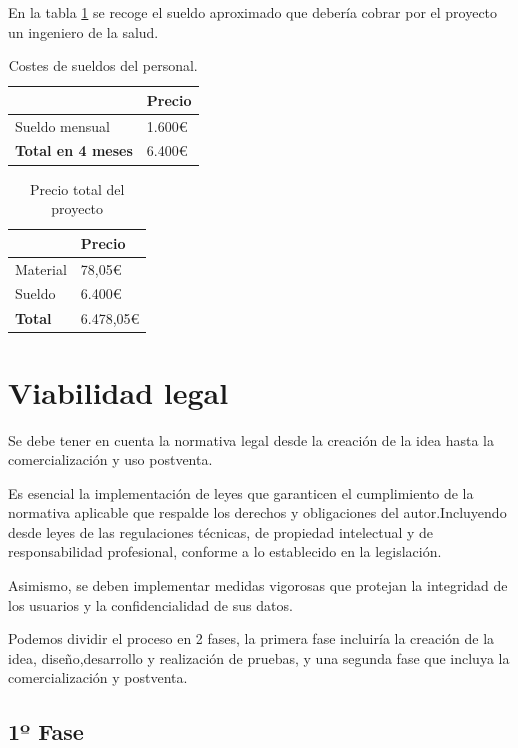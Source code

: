 En la tabla \ref{tab:costes_personal} se recoge el sueldo aproximado que debería cobrar por el proyecto un ingeniero de la salud.

\begin{table}[h]
\centering
\begin{tabular}{|l|l|}
\hline
\rowcolor[HTML]{BFBFBF} 
\textbf{} & \textbf{Precio} \\ \hline
Sueldo mensual & 1.600€ \\ \hline
\textbf{Total en 4 meses }& 6.400€ \\ \hline
\end{tabular}
\caption{Costes de sueldos del personal.}
\label{tab:costes_personal}
\end{table}

\begin{table}[h]
\centering
\begin{tabular}{|l|l|}
\hline
\rowcolor[HTML]{BFBFBF} 
\textbf{} & \textbf{Precio} \\ \hline
Material & 78,05€ \\ \hline
Sueldo  &  6.400€ \\ \hline
\textbf{Total }& 6.478,05€ \\ \hline
\end{tabular}
\caption{Precio total del proyecto}
\label{tab:Costes Totales}
\end{table}

\section{Viabilidad legal}
Se debe tener en cuenta la normativa legal desde la creación de la idea hasta la comercialización y uso postventa.

Es esencial la implementación de leyes que garanticen el cumplimiento de la normativa aplicable que respalde los derechos y obligaciones del autor.Incluyendo desde leyes de las regulaciones técnicas, de propiedad intelectual y de responsabilidad profesional, conforme a lo establecido en la legislación.

Asimismo, se deben implementar medidas vigorosas que protejan la integridad de los usuarios y la confidencialidad de sus datos. 

Podemos dividir el proceso en 2 fases, la primera fase incluiría la creación de la idea, diseño,desarrollo y realización de pruebas, y una segunda fase que incluya la comercialización y postventa.

\subsection{1º Fase}

